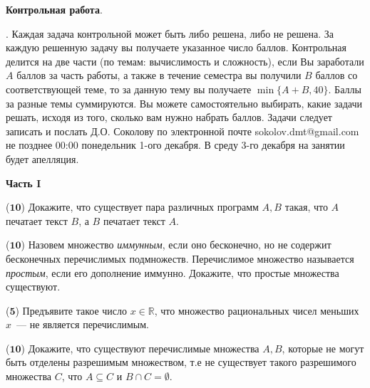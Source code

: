 \setcounter{curtask}{1}

\begin{center}
	{\bf Контрольная работа}.
\end{center}


.
Каждая задача контрольной может быть либо решена, либо не решена. За каждую решенную задачу вы получаете указанное число
баллов. Контрольная делится на две части (по темам: вычислимость и сложность), если Вы заработали $A$ баллов за часть работы, а
также в течение семестра вы получили $B$ баллов со соответствующей теме, то за данную тему вы получаете $\min \{A + B,
40\}$. Баллы за разные темы суммируются. Вы можете самостоятельно выбирать, какие задачи решать, исходя из того, сколько вам нужно
набрать баллов. Задачи следует записать и послать Д.О. Соколову по электронной почте sokolov.dmt@gmail.com не позднее 00:00
понедельник 1-ого декабря. В среду 3-го декабря на занятии будет апелляция.

\breakline


\setcounter{curtask}{1}

\begin{center}
    \textbf{Часть I}
\end{center}

\begin{task}($\mathbf{10}$)
    Докажите, что существует пара различных программ $A, B$ такая, что $A$ печатает текст $B$, а $B$ печатает текст $A$.
\end{task}

\begin{task}($\mathbf{10}$)
    Назовем множество {\it иммунным}, если оно бесконечно, но не содержит бесконечных перечислимых подмножеств. Перечислимое
	множество называется {\it простым}, если его дополнение иммунно.  Докажите, что простые множества существуют.
\end{task}

\begin{task}($\mathbf{5}$)
    Предъявите такое число $x \in \mathbb{R}$, что множество рациональных чисел меньших $x$~--- не является перечислимым.
\end{task}

\begin{task}($\mathbf{10}$)
    Докажите, что существуют перечислимые множества $A, B$, которые не могут быть отделены разрешимым множеством, т.е не
	существует такого разрешимого множества $C$, что $A \subseteq C$ и $B \cap C = \emptyset$.
\end{task}


